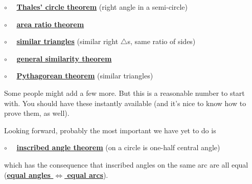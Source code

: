 \documentclass[11pt, oneside]{article}
\begin{document}
$\circ$ \ \ \hyperref[sec:Thales_theorem]{\textbf{Thales' circle theorem}} (right angle in a semi-circle)

$\circ$ \ \ \hyperref[sec:area_ratio_theorem]{\textbf{area ratio theorem}}

$\circ$ \ \  \hyperref[sec:similar_right_triangles]{\textbf{similar triangles}} (similar right $\triangle$s, same ratio of sides)

$\circ$ \ \ \hyperref[sec:similarity_and_ratios]{\textbf{general similarity theorem}}

$\circ$ \ \ \hyperref[sec:Pythagoras_similar_triangles]{\textbf{Pythagorean theorem}} (similar triangles)

Some people might add a few more.  But this is a reasonable number to start with.  You should have these instantly available (and it's nice to know how to prove them, as well).

Looking forward, probably the most important we have yet to do is

$\circ$ \ \ \hyperref[sec:inscribed_angle_theorem]{\textbf{inscribed angle theorem}} (on a circle is one-half central angle)

which has the consequence that inscribed angles on the same arc are all equal (\hyperref[sec:angles_on_same_arc]{\textbf{equal angles $\iff$ equal arcs}}).
\end{document}
